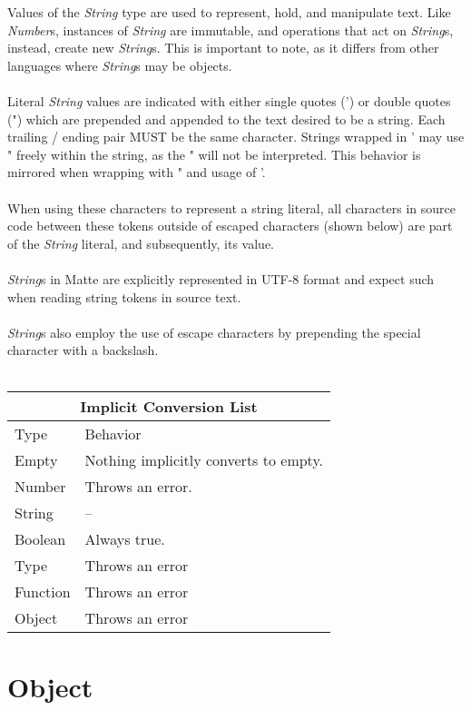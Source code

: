 \documentclass[12pt,letterpaper]{report}
\begin{document}
Values of the \textit{String} type are used to represent, hold, and manipulate text.
Like \textit{Number}s, instances of \textit{String} are immutable, and operations 
that act on \textit{String}s, instead, create new \textit{String}s. This is 
important to note, as it differs from other languages where \textit{String}s 
may be objects.
\\\\
Literal \textit{String} values are indicated with either single quotes (') or double quotes (")
which are prepended and appended to the text desired to be a string. Each trailing /
ending pair MUST be the same character. Strings wrapped in ' may use " freely within 
the string, as the " will not be interpreted. This behavior is mirrored when wrapping with " and usage of '.
\\\\
When using these characters to represent a string literal, all characters in source code between these tokens 
outside of escaped characters (shown below) are part of the \textit{String} literal, and subsequently, 
its value.
\\\\
\textit{String}s in Matte are explicitly represented in UTF-8 format and expect such 
when reading string tokens in source text.
\\\\
\textit{String}s also employ the use of escape characters by prepending the special 
character with a backslash.
\\\\
{
\centering
\begin{tabular}{ |p{2.5cm}||p{10cm}|  }
  \hline
  \multicolumn{2}{|c|}{Implicit Conversion List} \\
  \hline
  Type & Behavior\\
  \hline
  Empty & Nothing implicitly converts to empty.\\
  Number  & Throws an error. \\
  String & --\\
  Boolean & Always true. \\
  Type & Throws an error\\
  Function & Throws an error\\
  Object & Throws an error\\
 \hline
\end{tabular}
}





\section{Object}\label{Object}
\end{document}
